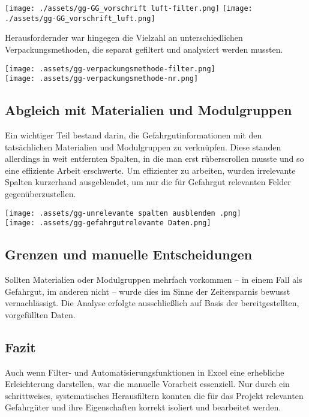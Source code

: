 \begin{center}
  \texttt{[image: ./assets/gg-GG\_vorschrift luft-filter.png]}
  \texttt{[image: ./assets/gg-GG\_vorschrift\_luft.png]}
\end{center}


Herausfordernder war hingegen die Vielzahl an unterschiedlichen Verpackungsmethoden, die separat gefiltert und 
analysiert werden mussten.

\begin{center}
\texttt{[image: .assets/gg-verpackungsmethode-filter.png]} \\
\texttt{[image: .assets/gg-verpackungsmethode-nr.png]}
\end{center}

\subsection{Abgleich mit Materialien und Modulgruppen}
Ein wichtiger Teil bestand darin, die Gefahrgutinformationen mit den tatsächlichen Materialien und Modulgruppen zu
verknüpfen. Diese standen allerdings in weit entfernten Spalten, in die man erst rüberscrollen musste und so eine 
effiziente Arbeit erschwerte. Um effizienter zu arbeiten, wurden irrelevante Spalten kurzerhand ausgeblendet, um nur 
die für Gefahrgut relevanten Felder gegenüberzustellen.

\begin{center}
\texttt{[image: .assets/gg-unrelevante spalten ausblenden .png]} \\
\texttt{[image: .assets/gg-gefahrgutrelevante Daten.png]}
\end{center}

\subsection{Grenzen und manuelle Entscheidungen}
Sollten Materialien oder Modulgruppen mehrfach vorkommen – in einem Fall als Gefahrgut, im anderen nicht – wurde dies 
im Sinne der Zeitersparnis bewusst vernachlässigt. Die Analyse erfolgte ausschließlich auf Basis der bereitgestellten, 
vorgefüllten Daten.

\subsection{Fazit}
Auch wenn Filter- und Automatisierungsfunktionen in Excel eine erhebliche Erleichterung darstellen, war die manuelle 
Vorarbeit essenziell. Nur durch ein schrittweises, systematisches Herausfiltern konnten die für das Projekt relevanten 
Gefahrgüter und ihre Eigenschaften korrekt isoliert und bearbeitet werden.
